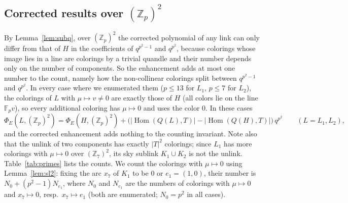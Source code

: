 \documentclass[11pt]{article}
\theoremstyle{definition}
\newcommand{\Z}{\mathbb{Z}}
\newcommand{\F}{\mathbb{F}}
\newcommand{\Hom}{\operatorname{Hom}}
\newcommand{\PhiE}{\Phi_E}
\begin{document}
\subsection{\texorpdfstring{Corrected results over $(\Z_p)^2$}{Corrected results over (Z_p)^2}}\label{ssec:primes}

By Lemma~\ref{lem:subq}, over $(\Z_p)^2$ the corrected polynomial of any link can only differ from
that of $H$ in the coefficients of $q^{p^2-1}$ and $q^{p^2}$, because colorings whose image lies in a line
are colorings by a trivial quandle and their number depends only on the number of components. So the
enhancement adds at most one number to the count, namely how the non-collinear colorings split between
$q^{p^2-1}$ and $q^{p^2}$. In every case where we enumerated them ($p\le13$ for $L_1$, $p\le7$ for $L_2$),
the colorings of $L$ with $\mu\mapsto v\neq0$ are exactly those of $H$ (all colors lie on the line
$\F_pv$), so every additional coloring has $\mu\mapsto0$ and uses the color $0$. In these cases
\[
\PhiE(L,(\Z_p)^2)=\PhiE(H,(\Z_p)^2)+\bigl(|\Hom(Q(L),T)|-|\Hom(Q(H),T)|\bigr)\,q^{p^2}\qquad(L=L_1,L_2),
\]
and the corrected enhancement adds nothing to the counting invariant. Note also that the
unlink of two components has exactly $|T|^2$ colorings; since $L_1$ has more colorings with $\mu\mapsto0$
over $(\Z_7)^2$, its sky sublink $K_1\cup K_2$ is not the unlink. Table~\ref{tab:primes}
lists the counts. We count the colorings with $\mu\mapsto0$ using Lemma~\ref{lem:sl2}: fixing the arc
$x_7$ of $K_1$ to be $0$ or $e_1=(1,0)$, their number is $N_0+(p^2-1)N_{e_1}$, where $N_0$ and $N_{e_1}$ are
the numbers of colorings with $\mu\mapsto0$ and $x_7\mapsto0$, resp.\ $x_7\mapsto e_1$ (both are enumerated;
$N_0=p^2$ in all cases).
\end{document}
